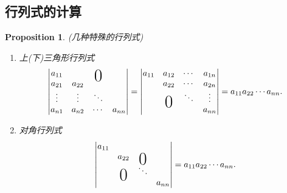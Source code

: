 \documentclass{article}
\newtheorem{proposition}[theorem]{Proposition}
\newcommand\bigzero{\makebox(0,0){\text{\huge0}}} %
\begin{document}
\newpage
\subsection{行列式的计算}
\begin{proposition}
\rm {\color{red} (几种特殊的行列式)}
\begin{enumerate}
	\item {\color{red}上(下)三角形行列式}
	$$
	\begin{vmatrix}
	a_{11} & & \bigzero\\
	a_{21} & a_{22} \\
	\vdots & \vdots & \ddots \\
	a_{n1} & a_{n2} & \cdots & a_{nn}
	\end{vmatrix} =
	\begin{vmatrix}
	a_{11} & a_{12} & \cdots & a_{1n}\\
	&	a_{22} & \cdots & a_{2n} \\
	&\bigzero& \ddots & \vdots \\
	&&& a_{nn} \\
	\end{vmatrix} = a_{11}a_{22}\cdots a_{nn}.
	$$
	\item {\color{red}对角行列式}
	$$
	\begin{vmatrix}
	a_{11} &&& \\
	&a_{22} &\bigzero& \\
	&\bigzero&\ddots& \\
	&&&a_{nn}
	\end{vmatrix} = a_{11}a_{22}\cdots a_{nn}.
	$$
\end{enumerate}
\end{proposition}
\end{document}
